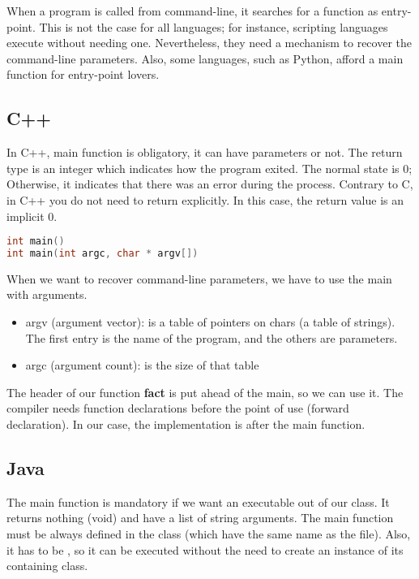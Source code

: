 \documentclass{KodeBook}
\begin{document}
When a program is called from command-line, it searches for a function as entry-point. 
This is not the case for all languages; for instance, scripting languages execute without needing one. 
Nevertheless, they need a mechanism to recover the command-line parameters. 
Also, some languages, such as Python, afford a main function for entry-point lovers.

\subsection{C++}

In C++, main function is obligatory,  it can have parameters or not. 
The return type is an integer which indicates how the program exited. 
The normal state is 0; Otherwise, it indicates that there was an error during the process.
Contrary to C, in C++ you do not need to return explicitly.
In this case, the return value is an implicit 0.
\begin{lstlisting}[language=C++, style=codeStyle]
int main()
int main(int argc, char * argv[])
\end{lstlisting}

When we want to recover command-line parameters, we have to use the main with arguments. 
\begin{itemize}
	\item argv (argument vector): is a table of pointers on chars (a table of strings).
	The first entry is the name of the program, and the others are parameters. 
	\item argc (argument count): is the size of that table
\end{itemize}



The header of our function \textbf{fact} is put ahead of the main, so we can use it. 
The compiler needs function declarations before the point of use (forward declaration). 
In our case, the implementation is after the main function.

\subsection{Java}

The main function is mandatory if we want an executable out of our class. 
It returns nothing (void) and have a list of string arguments. 
The main function must be always defined in the  class (which have the same name as the file). 
Also, it has to be , so it can be executed without the need to create an instance of its containing class.
\end{document}
